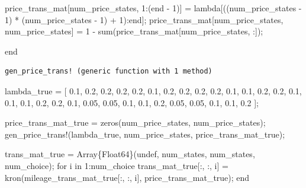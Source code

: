\documentclass[
  letterpaper,
  DIV=11,
  numbers=noendperiod]{scrreprt}
\newenvironment{Shaded}{\begin{snugshade}}{\end{snugshade}}
\newcommand{\ConstantTok}[1]{\textcolor[rgb]{0.56,0.35,0.01}{#1}}
\newcommand{\ControlFlowTok}[1]{\textcolor[rgb]{0.00,0.23,0.31}{#1}}
\newcommand{\DataTypeTok}[1]{\textcolor[rgb]{0.68,0.00,0.00}{#1}}
\newcommand{\FloatTok}[1]{\textcolor[rgb]{0.68,0.00,0.00}{#1}}
\newcommand{\FunctionTok}[1]{\textcolor[rgb]{0.28,0.35,0.67}{#1}}
\newcommand{\KeywordTok}[1]{\textcolor[rgb]{0.00,0.23,0.31}{#1}}
\newcommand{\NormalTok}[1]{\textcolor[rgb]{0.00,0.23,0.31}{#1}}
\newcommand{\OperatorTok}[1]{\textcolor[rgb]{0.37,0.37,0.37}{#1}}
\begin{document}
\begin{Shaded}
\begin{Highlighting}[]
\NormalTok{    price\_trans\_mat[num\_price\_states, }\FloatTok{1}\OperatorTok{:}\NormalTok{(}\KeywordTok{end} \OperatorTok{{-}} \FloatTok{1}\NormalTok{)] }\OperatorTok{=}\NormalTok{ lambda[((num\_price\_states }\OperatorTok{{-}} \FloatTok{1}\NormalTok{) }\OperatorTok{*}\NormalTok{ (num\_price\_states }\OperatorTok{{-}} \FloatTok{1}\NormalTok{) }\OperatorTok{+} \FloatTok{1}\NormalTok{)}\OperatorTok{:}\KeywordTok{end}\NormalTok{];}
\NormalTok{    price\_trans\_mat[num\_price\_states, num\_price\_states] }\OperatorTok{=} \FloatTok{1} \OperatorTok{{-}} \FunctionTok{sum}\NormalTok{(price\_trans\_mat[num\_price\_states, }\OperatorTok{:}\NormalTok{]);}

\KeywordTok{end}
\end{Highlighting}
\end{Shaded}

\begin{verbatim}
gen_price_trans! (generic function with 1 method)
\end{verbatim}

\begin{Shaded}
\begin{Highlighting}[]
\NormalTok{lambda\_true }\OperatorTok{=}\NormalTok{ [}
    \FloatTok{0.1}\NormalTok{, }\FloatTok{0.2}\NormalTok{, }\FloatTok{0.2}\NormalTok{, }\FloatTok{0.2}\NormalTok{, }\FloatTok{0.2}\NormalTok{,}
    \FloatTok{0.1}\NormalTok{, }\FloatTok{0.2}\NormalTok{, }\FloatTok{0.2}\NormalTok{, }\FloatTok{0.2}\NormalTok{, }\FloatTok{0.2}\NormalTok{,}
    \FloatTok{0.1}\NormalTok{, }\FloatTok{0.1}\NormalTok{, }\FloatTok{0.2}\NormalTok{, }\FloatTok{0.2}\NormalTok{, }\FloatTok{0.1}\NormalTok{,}
    \FloatTok{0.1}\NormalTok{, }\FloatTok{0.1}\NormalTok{, }\FloatTok{0.2}\NormalTok{, }\FloatTok{0.2}\NormalTok{, }\FloatTok{0.1}\NormalTok{,}
    \FloatTok{0.05}\NormalTok{, }\FloatTok{0.05}\NormalTok{, }\FloatTok{0.1}\NormalTok{, }\FloatTok{0.1}\NormalTok{, }\FloatTok{0.2}\NormalTok{,}
    \FloatTok{0.05}\NormalTok{, }\FloatTok{0.05}\NormalTok{, }\FloatTok{0.1}\NormalTok{, }\FloatTok{0.1}\NormalTok{, }\FloatTok{0.2}
\NormalTok{];}

\NormalTok{price\_trans\_mat\_true }\OperatorTok{=} \FunctionTok{zeros}\NormalTok{(num\_price\_states, num\_price\_states);}
\FunctionTok{gen\_price\_trans!}\NormalTok{(lambda\_true, num\_price\_states, price\_trans\_mat\_true);}
\end{Highlighting}
\end{Shaded}

\begin{Shaded}
\begin{Highlighting}[]
\NormalTok{trans\_mat\_true }\OperatorTok{=} \FunctionTok{Array}\DataTypeTok{\{Float64\}}\NormalTok{(}\ConstantTok{undef}\NormalTok{, num\_states, num\_states, num\_choice);}
\ControlFlowTok{for}\NormalTok{ i }\KeywordTok{in} \FloatTok{1}\OperatorTok{:}\NormalTok{num\_choice}
\NormalTok{    trans\_mat\_true[}\OperatorTok{:}\NormalTok{, }\OperatorTok{:}\NormalTok{, i] }\OperatorTok{=} \FunctionTok{kron}\NormalTok{(mileage\_trans\_mat\_true[}\OperatorTok{:}\NormalTok{, }\OperatorTok{:}\NormalTok{, i], price\_trans\_mat\_true);}
\ControlFlowTok{end}
\end{Highlighting}
\end{Shaded}
\end{document}
